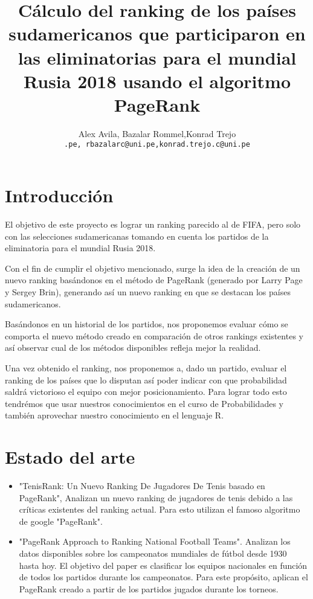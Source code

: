 \documentclass[twocolumn]{article}
\begin{document}
 

\title{
Cálculo del ranking de los países sudamericanos que participaron en las eliminatorias para el mundial Rusia 2018 usando el algoritmo PageRank
}
\date{}
\author{Alex Avila, Bazalar Rommel,Konrad Trejo\\
\small{\texttt{\@aavilas@uni.pe, rbazalarc@uni.pe,konrad.trejo.c@uni.pe}}}
\maketitle

\section{Introducción}

	El objetivo de este proyecto es lograr un ranking parecido al de FIFA, pero solo con las selecciones sudamericanas tomando en cuenta los partidos de la eliminatoria para el mundial Rusia 2018.

	Con el fin de cumplir el objetivo mencionado, surge la idea de la creación de un nuevo ranking basándonos en el método de PageRank (generado por Larry Page y Sergey Brin), generando así un nuevo ranking en que se destacan los países sudamericanos.

	Basándonos en un historial de los partidos, nos proponemos evaluar cómo se comporta el nuevo método creado en comparación de otros rankings existentes y así observar cual de los métodos disponibles refleja mejor la realidad.

	Una vez obtenido el ranking, nos proponemos a, dado un partido, evaluar el ranking de los países que lo disputan  así poder indicar con que probabilidad saldrá victorioso el equipo con mejor posicionamiento. Para lograr todo esto tendrémos que usar nuestros conocimientos en el curso de Probabilidades y también aprovechar nuestro conocimiento en el lenguaje R.


\section{Estado del arte}
\begin{itemize}
	\item
	"TenisRank: Un Nuevo Ranking De Jugadores De Tenis
basado en PageRank", Analizan un nuevo ranking de jugadores de tenis debido a las críticas existentes del ranking actual. Para esto utilizan el famoso algoritmo de google "PageRank".
	\item
	"PageRank Approach to Ranking National Football Teams". Analizan los datos disponibles sobre los campeonatos mundiales de fútbol desde 1930 hasta hoy. El objetivo del paper es clasificar los equipos nacionales en función de todos los partidos durante los campeonatos. Para este propósito, aplican el PageRank creado a partir de los partidos jugados durante los torneos. 
	\end{itemize}	
\end{document}
